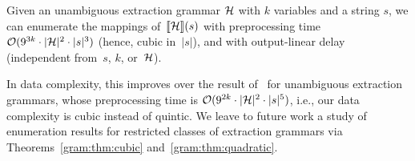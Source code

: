 \begin{theorem}
  Given an unambiguous extraction grammar $\mathcal{H}$ with $k$ variables and a string $s$, we can
  enumerate the mappings of~${\llbracket{\mathcal{H}}\rrbracket}(s)$ with preprocessing time 
  $\mathcal{O}(9^{3k} \cdot |\mathcal{H}|^2 \cdot |s|^3)$ (hence, cubic in~$|s|$), and with output-linear delay
  (independent from~$s$, $k$, or~$\mathcal{H}$).
\end{theorem}

%
%

In data complexity, this improves over the result of~\cite{Peterfreund21}
%
%
%
for unambiguous extraction grammars, whose preprocessing time is
$\mathcal{O}(9^{2k} \cdot |\mathcal{H}|^2 \cdot |s|^5)$, i.e.,
%
%
our data complexity is cubic instead of quintic.
%
%
%
%
We leave to future work a study of enumeration results for
restricted classes of extraction grammars via %
Theorems~\ref{gram:thm:cubic} and~\ref{gram:thm:quadratic}.
%


